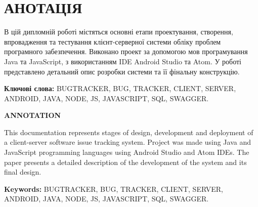 \chapter*{АНОТАЦІЯ}

В цій дипломній роботі містяться основні етапи проектування, створення, впровадження та тестування клієнт-серверної системи обліку проблем програмного забезпечення. Виконано проект за допомогою мов програмування Java та JavaScript, з використанням IDE Android Studio та Atom. У роботі представлено детальний опис розробки системи та її фінальну конструкцію.

\textbf{Ключові слова:} BUGTRACKER, BUG, TRACKER, CLIENT, SERVER, ANDROID, JAVA, NODE, JS, JAVASCRIPT, SQL, SWAGGER.

\hfill

\begin{center}
	\textbf{\MakeUppercase{Annotation}}
\end{center}

This documentation represents stages of design, development and deployment of a client-server software issue tracking system. Project was made using Java and JavaScript programming languages using Android Studio and Atom IDEs. The paper presents a detailed description of the development of the system and its final design.

\textbf{Keywords:} BUGTRACKER, BUG, TRACKER, CLIENT, SERVER, ANDROID, JAVA, NODE, JS, JAVASCRIPT, SQL, SWAGGER.
